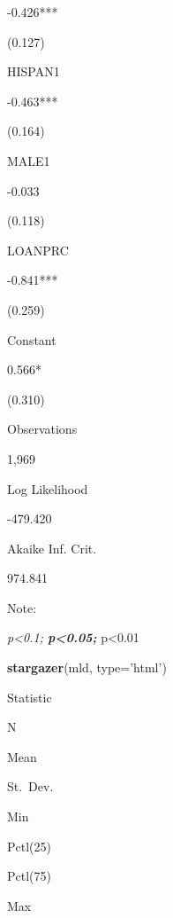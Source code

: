 \documentclass[]{article}
\newenvironment{Shaded}{\begin{snugshade}}{\end{snugshade}}
\newcommand{\DataTypeTok}[1]{\textcolor[rgb]{0.13,0.29,0.53}{#1}}
\newcommand{\KeywordTok}[1]{\textcolor[rgb]{0.13,0.29,0.53}{\textbf{#1}}}
\newcommand{\NormalTok}[1]{#1}
\newcommand{\StringTok}[1]{\textcolor[rgb]{0.31,0.60,0.02}{#1}}
\begin{document}
-0.426***

(0.127)

HISPAN1

-0.463***

(0.164)

MALE1

-0.033

(0.118)

LOANPRC

-0.841***

(0.259)

Constant

0.566*

(0.310)

Observations

1,969

Log Likelihood

-479.420

Akaike Inf. Crit.

974.841

Note:

\emph{p\textless{}0.1; \textbf{p\textless{}0.05; }}p\textless{}0.01

\begin{Shaded}
\begin{Highlighting}[]
\KeywordTok{stargazer}\NormalTok{(mld, }\DataTypeTok{type=}\StringTok{'html'}\NormalTok{) }
\end{Highlighting}
\end{Shaded}

Statistic

N

Mean

St.~Dev.

Min

Pctl(25)

Pctl(75)

Max
\end{document}
